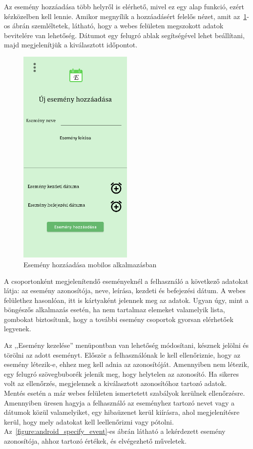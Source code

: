 \documentclass[
]{thesis-ekf}
\theoremstyle{definition}
\theoremstyle{remark}
\begin{document}
	Az esemény hozzáadása több helyről is elérhető, mivel ez egy alap funkció, ezért kézközelben kell lennie. Amikor megnyílik a hozzáadásért felelős nézet, amit az~\ref{figure:androidapp_add_event}-os ábrán szemléltetek, látható, hogy a webes felületen megszokott adatok bevitelére van lehetőség. Dátumot egy felugró ablak segítségével lehet beállítani, majd megjelenítjük a kiválasztott időpontot. 
	
	\begin{figure}[ht!]
		\centering
		\includegraphics[width=0.5\textwidth]{android_app/android_add_event}
		\caption{Esemény hozzáadása mobilos alkalmazásban}
		\label{figure:androidapp_add_event}
	\end{figure}
	
	A csoportonként megjelenítendő eseményeknél a felhasználó a következő adatokat látja: az esemény azonosítója, neve, leírása, kezdeti és befejezési dátum. A webes felülethez hasonlóan, itt is kártyaként jelennek meg az adatok. Ugyan úgy, mint a böngészős alkalmazás esetén, ha nem tartalmaz elemeket valamelyik lista, gombokat biztosítunk, hogy a további esemény csoportok gyorsan elérhetőek legyenek.
	
	Az ,,Esemény kezelése'' menüpontban van lehetőség módosítani, késznek jelölni és törölni az adott eseményt. Először a felhasználónak le kell ellenőriznie, hogy az esemény létezik-e, ehhez meg kell adnia az azonosítóját. Amennyiben nem létezik, egy felugró szövegbuborék jelenik meg, hogy helytelen az azonosító. Ha sikeres volt az ellenőrzés, megjelennek a kiválasztott azonosítóhoz tartozó adatok. Mentés esetén a már webes felületen ismertetett szabályok kerülnek ellenőrzésre. Amennyiben üresen hagyja a felhasználó az eseményhez tartozó nevet vagy a dátumok közül valamelyiket, egy hibaüzenet kerül kiírásra, ahol megjelenítésre kerül, hogy mely adatokat kell leellenőrizni vagy pótolni. Az~\ref{figure:android_specify_event}-es ábrán látható a lekérdezett esemény azonosítója, ahhoz tartozó értékek, és elvégezhető műveletek. 
	
\end{document}
